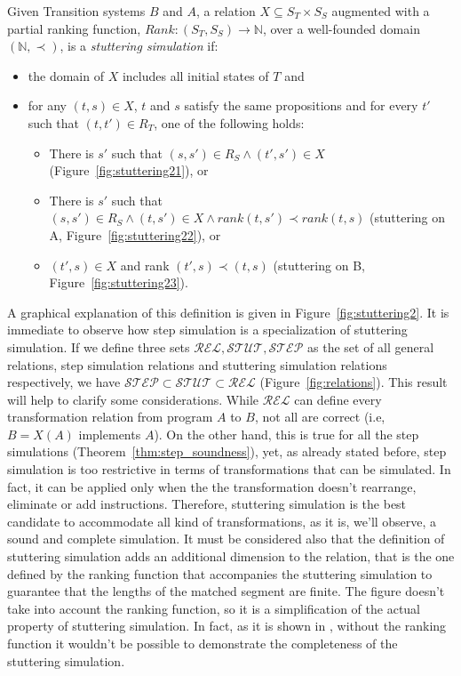 \begin{fdefinition}
\label{def:stuttering_simulation}
Given Transition systems $B$ and $A$, a relation $ X \subseteq S_T \times S_S $ augmented with a partial ranking function, $Rank: (S_T,S_S) \rightarrow \mathbb{N}$, over a well-founded domain $(\mathbb{N},\prec)$, is a \emph{stuttering simulation} if:
\begin{itemize}
  \item the domain of $X$ includes all initial states of $T$ and
  \item for any $(t, s) \in X$, $t$ and $s$ satisfy the same propositions and for every $t'$ such that $(t,t') \in R_T$, one of the following holds:
  \begin{itemize}
    \item There is $s'$ such that $(s,s') \in R_S \land (t',s') \in X$ (Figure~\ref{fig:stuttering21}), or
    \item There is $s'$ such that $(s,s') \in R_S \land (t,s') \in X \land rank(t,s') \prec rank(t,s)$ (stuttering on A, Figure~\ref{fig:stuttering22}), or
    \item $(t',s) \in X$ and rank $(t',s) \prec (t,s)$ (stuttering on B, Figure~\ref{fig:stuttering23}).
  \end{itemize}
\end{itemize}
\end{fdefinition}

A graphical explanation of this definition is given in Figure~\ref{fig:stuttering2}. It is immediate to observe how step simulation is a specialization of stuttering simulation. If we define three sets $\mathcal{REL},\mathcal{STUT},\mathcal{STEP}$ as the set of all general relations, step simulation relations and stuttering simulation relations respectively, we have $\mathcal{STEP} \subset \mathcal{STUT} \subset \mathcal{REL}$ (Figure~\ref{fig:relations}). This result will help to clarify some considerations. While $\mathcal{REL}$ can define every transformation relation from program $A$ to $B$, not all are correct (i.e, $B=X(A)$ implements $A$). On the other hand, this is true for all the step simulations (Theorem~\ref{thm:step_soundness}), yet, as already stated before, step simulation is too restrictive in terms of transformations that can be simulated. In fact, it can be applied only when the the transformation doesn't rearrange, eliminate or add instructions. Therefore, stuttering simulation is the best candidate to accommodate all kind of transformations, as it is, we'll observe, a sound and complete simulation. It must be considered also that the definition of stuttering simulation adds an additional dimension to the relation, that is the one defined by the ranking function that accompanies the stuttering simulation to guarantee that the lengths of the matched segment are finite. The figure doesn't take into account the ranking function, so it is a simplification of the actual property of stuttering simulation. In fact, as it is shown in \cite{zucknamjoshi}, without the ranking function it wouldn't be possible to demonstrate the completeness of the stuttering simulation.


